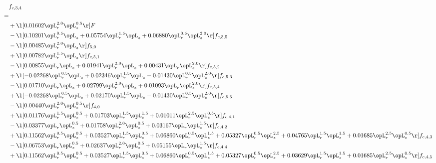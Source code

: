 \begin{alignat}{2} 
\label{eq:f_34_2} 
& f_{c,3,4} \nonumber \\ 
 = \\ 
& + \l[  0.01602 \opL_r^{2.0} \opL_z^{0.5}  \r] F \nonumber \\ 
& - \l[  0.10201 \opL_r^{0.5} \opL_z +  0.05754 \opL_r^{1.5} \opL_z +  0.06880 \opL_r^{0.5} \opL_z^{2.0}  \r] f_{c,3,5} \nonumber \\ 
& - \l[  0.00485 \opL_r^{2.0} \opL_z  \r] f_{5,0} \nonumber \\ 
& + \l[  0.00782 \opL_r^{1.5} \opL_z  \r] f_{c,5,1} \nonumber \\ 
& - \l[  0.00855 \opL_r \opL_z +  0.01941 \opL_r^{2.0} \opL_z +  0.00431 \opL_r \opL_z^{2.0}  \r] f_{c,5,2} \nonumber \\ 
& + \l[  -0.02268 \opL_r^{0.5} \opL_z +  0.02346 \opL_r^{1.5} \opL_z   -0.01430 \opL_r^{0.5} \opL_z^{2.0}  \r] f_{c,5,3} \nonumber \\ 
& - \l[  0.01710 \opL_r \opL_z +  0.02799 \opL_r^{2.0} \opL_z +  0.01093 \opL_r \opL_z^{2.0}  \r] f_{c,5,4} \nonumber \\ 
& + \l[  -0.02268 \opL_r^{0.5} \opL_z +  0.02170 \opL_r^{1.5} \opL_z   -0.01430 \opL_r^{0.5} \opL_z^{2.0}  \r] f_{c,5,5} \nonumber \\ 
& - \l[  0.00440 \opL_r^{2.0} \opL_z^{0.5}  \r] f_{4,0} \nonumber \\ 
& + \l[  0.01176 \opL_r^{1.5} \opL_z^{0.5} +  0.01703 \opL_r^{1.5} \opL_z^{1.5} +  0.01011 \opL_r^{2.5} \opL_z^{0.5}  \r] f_{c,4,1} \nonumber \\ 
& - \l[  0.03377 \opL_r \opL_z^{0.5} +  0.01758 \opL_r^{2.0} \opL_z^{0.5} +  0.03167 \opL_r \opL_z^{1.5}  \r] f_{c,4,2} \nonumber \\ 
& + \l[  0.11562 \opL_r^{0.5} \opL_z^{0.5} +  0.03527 \opL_r^{1.5} \opL_z^{0.5} +  0.06860 \opL_r^{0.5} \opL_z^{1.5} +  0.05327 \opL_r^{0.5} \opL_z^{2.5} +  0.04765 \opL_r^{1.5} \opL_z^{1.5} +  0.01685 \opL_r^{2.5} \opL_z^{0.5}  \r] f_{c,4,3} \nonumber \\ 
& - \l[  0.06753 \opL_r \opL_z^{0.5} +  0.02637 \opL_r^{2.0} \opL_z^{0.5} +  0.05155 \opL_r \opL_z^{1.5}  \r] f_{c,4,4} \nonumber \\ 
& + \l[  0.11562 \opL_r^{0.5} \opL_z^{0.5} +  0.03527 \opL_r^{1.5} \opL_z^{0.5} +  0.06860 \opL_r^{0.5} \opL_z^{1.5} +  0.05327 \opL_r^{0.5} \opL_z^{2.5} +  0.03629 \opL_r^{1.5} \opL_z^{1.5} +  0.01685 \opL_r^{2.5} \opL_z^{0.5}  \r] f_{c,4,5} \nonumber \\ 
\end{alignat} 


